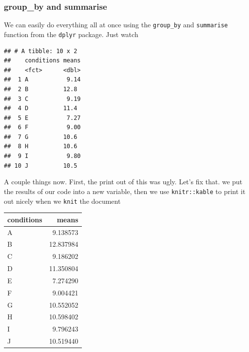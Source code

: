 \documentclass[]{book}
\newenvironment{Shaded}{\begin{snugshade}}{\end{snugshade}}
\newcommand{\KeywordTok}[1]{\textcolor[rgb]{0.13,0.29,0.53}{\textbf{#1}}}
\newcommand{\DataTypeTok}[1]{\textcolor[rgb]{0.13,0.29,0.53}{#1}}
\newcommand{\StringTok}[1]{\textcolor[rgb]{0.31,0.60,0.02}{#1}}
\newcommand{\OperatorTok}[1]{\textcolor[rgb]{0.81,0.36,0.00}{\textbf{#1}}}
\newcommand{\NormalTok}[1]{#1}
\begin{document}
\subsubsection{group\_by and summarise}\label{group_by-and-summarise}

We can easily do everything all at once using the \texttt{group\_by} and
\texttt{summarise} function from the \texttt{dplyr} package. Just watch

\begin{Shaded}
\end{Shaded}

\begin{verbatim}
## # A tibble: 10 x 2
##    conditions means
##    <fct>      <dbl>
##  1 A           9.14
##  2 B          12.8 
##  3 C           9.19
##  4 D          11.4 
##  5 E           7.27
##  6 F           9.00
##  7 G          10.6 
##  8 H          10.6 
##  9 I           9.80
## 10 J          10.5
\end{verbatim}

A couple things now. First, the print out of this was ugly. Let's fix
that. we put the results of our code into a new variable, then we use
\texttt{knitr::kable} to print it out nicely when we \texttt{knit} the
document

\begin{Shaded}
\end{Shaded}

\begin{tabular}{l|r}
\hline
conditions & means\\
\hline
A & 9.138573\\
\hline
B & 12.837984\\
\hline
C & 9.186202\\
\hline
D & 11.350804\\
\hline
E & 7.274290\\
\hline
F & 9.004421\\
\hline
G & 10.552052\\
\hline
H & 10.598402\\
\hline
I & 9.796243\\
\hline
J & 10.519440\\
\hline
\end{tabular}
\end{document}
